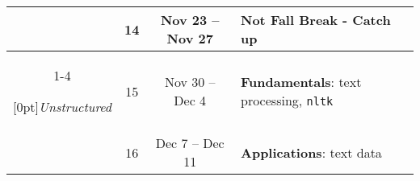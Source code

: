 \documentclass[10pt]{memoir}
\begin{document}
\begin{table}[h]
\begin{tabular}{cccl}
    & 14 & Nov 23 -- Nov 27 & Not Fall Break - Catch up \\ \cmidrule[.1em](lr){1-4}
    
    \multirow{2}{*}[0pt]{\textit{Unstructured}} %
        & 15 & Nov 30 -- Dec 4 & \textbf{Fundamentals}: text processing, \texttt{nltk} \\ 
        & 16 & Dec 7 -- Dec 11 & \textbf{Applications}: text data \\
        
    \bottomrule[.15em]
\end{tabular}\\
\end{table}

\renewcommand{\bibsection}{\section{\huge \bibname}\prebibhook}
\baselineskip 14.2pt

\end{document}
